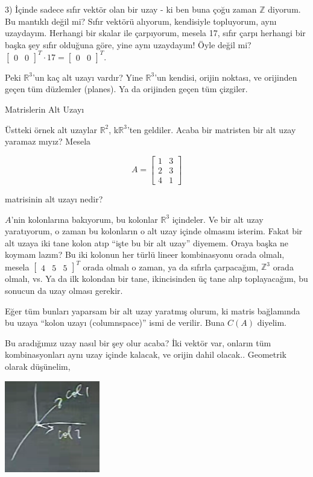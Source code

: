 \documentclass[12pt,fleqn]{article}\usepackage{../../common}
\begin{document}
3) İçinde sadece sıfır vektör olan bir uzay - ki ben buna çoğu zaman
$\mathbb{Z}$ diyorum. Bu mantıklı değil mi? Sıfır vektörü alıyorum,
kendisiyle topluyorum, aynı uzaydayım. Herhangi bir skalar ile çarpıyorum,
mesela 17, sıfır çarpı herhangi bir başka şey sıfır olduğuna göre, yine
aynı uzaydayım! Öyle değil mi? $\left[\begin{array}{rr}0 &
 0\end{array}\right]^T \cdot 17 = \left[\begin{array}{rr}0 &
 0\end{array}\right]^T$.

Peki $\mathbb{R}^3$'un kaç alt uzayı vardır? Yine $\mathbb{R}^3$'un
kendisi, orijin noktası, ve orijinden geçen tüm düzlemler (planes). Ya da
orijinden geçen tüm çizgiler. 

Matrislerin Alt Uzayı

Üstteki örnek alt uzaylar $\mathbb{R}^2$, k$\mathbb{R}^3$'ten
geldiler. Acaba bir matristen bir alt uzay yaramaz mıyız? Mesela 

$$  A =
\left[\begin{array}{rr}
1 & 3 \\
2 & 3 \\
4 & 1 
\end{array}\right]
 $$

matrisinin alt uzayı nedir? 

$A$'nin kolonlarına bakıyorum, bu kolonlar $\mathbb{R}^3$ içindeler. Ve bir
alt uzay yaratıyorum, o zaman bu kolonların o alt uzay içinde olmasını
isterim. Fakat bir alt uzaya iki tane kolon atıp ``işte bu bir alt uzay''
diyemem. Oraya başka ne koymam lazım? Bu iki kolonun her türlü lineer
kombinasyonu orada olmalı, mesela $ \left[\begin{array}{rrr}4 & 5 &
5\end{array}\right]^T$ orada olmalı o zaman, ya da sıfırla çarpacağım,
$\mathbb{Z}^3$ orada olmalı, vs. Ya da ilk kolondan bir tane, ikincisinden
üç tane alıp toplayacağım, bu sonucun da uzay olması gerekir. 

Eğer tüm bunları yaparsam bir alt uzay yaratmış olurum, ki matris
bağlamında bu uzaya ``kolon uzayı (columnspace)'' ismi de verilir. Buna
$C(A)$ diyelim. 

Bu aradığımız uzay nasıl bir şey olur acaba? İki vektör var, onların tüm
kombinasyonları aynı uzay içinde kalacak, ve orijin dahil
olacak.. Geometrik olarak düşünelim,

\includegraphics[height=4cm]{5_05.png}
\end{document}
